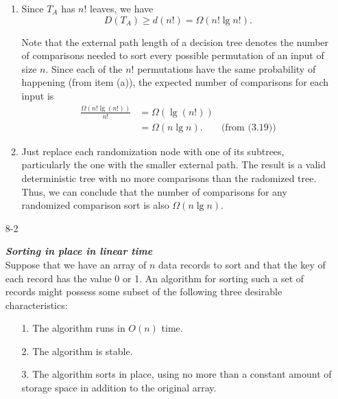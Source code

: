 \documentclass{report}
\makeatletter
\renewenvironment{framed}{%
 \def\FrameCommand##1{\hskip\@totalleftmargin
 \fboxsep=\FrameSep\fbox{##1}}%
 \MakeFramed {\advance\hsize-\width
   \@totalleftmargin\z@ \linewidth\hsize
   \@setminipage}}%
 {\par\unskip\endMakeFramed}
\makeatother
\begin{document}
\begin{enumerate}
\begin{framed}
\begin{enumerate}
\item{Since $T_A$ has $n!$ leaves, we have
\[
  D(T_A) \ge d(n!) = \Omega(n! \lg n!).
\]

Note that the external path length of a decision tree denotes the number of
comparisons needed to sort every possible permutation of an input of size $n$.
Since each of the $n!$ permutations have the same probability of happening
(from item (a)), the expected number of comparisons for each input is
\begin{equation*}
\begin{aligned}
  \frac{\Omega(n! \lg (n!))}{n!} &= \Omega(\lg (n!))\\
                                 &= \Omega(n \lg n). & \text{(from (3.19))}
\end{aligned}
\end{equation*}
}

\item{Just replace each randomization node with one of its subtrees,
particularly the one with the smaller external path. The result is a valid
deterministic tree with no more comparisons than the radomized tree. Thus, we
can conclude that the number of comparisons for any randomized comparison sort
is also $\Omega(n \lg n)$}.

\end{enumerate}
\end{framed}

\newpage

\item[8-2]{\textbf{\emph{Sorting in place in linear time}}\\
Suppose that we have an array of $n$ data records to sort and that the key of
each record has the value 0 or 1. An algorithm for sorting such a set of records
might possess some subset of the following three desirable characteristics:
\begin{enumerate}
  \item[1.] The algorithm runs in $O(n)$ time.
  \item[2.] The algorithm is stable.
  \item[3.] The algorithm sorts in place, using no more than a constant
    amount of storage space in addition to the original array.
\end{enumerate}

}
\end{enumerate}
\end{document}
